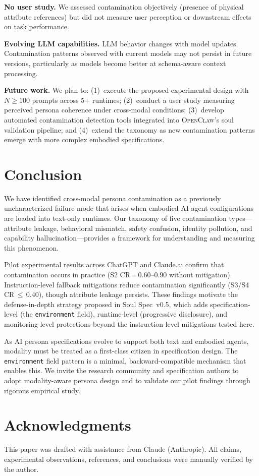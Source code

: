 \documentclass[manuscript,screen,nonacm]{acmart}
\begin{document}
\textbf{No user study.}
We assessed contamination objectively (presence of physical attribute references) but did not measure user perception or downstream effects on task performance.

\textbf{Evolving LLM capabilities.}
LLM behavior changes with model updates.
Contamination patterns observed with current models may not persist in future versions, particularly as models become better at schema-aware context processing.

\textbf{Future work.}
We plan to: (1)~execute the proposed experimental design with $N \geq 100$ prompts across 5+ runtimes; (2)~conduct a user study measuring perceived persona coherence under cross-modal conditions; (3)~develop automated contamination detection tools integrated into \textsc{OpenClaw}'s soul validation pipeline; and (4)~extend the taxonomy as new contamination patterns emerge with more complex embodied specifications.


\section{Conclusion}
\label{sec:conclusion}

We have identified cross-modal persona contamination as a previously uncharacterized failure mode that arises when embodied AI agent configurations are loaded into text-only runtimes.
Our taxonomy of five contamination types---attribute leakage, behavioral mismatch, safety confusion, identity pollution, and capability hallucination---provides a framework for understanding and measuring this phenomenon.

Pilot experimental results across ChatGPT and Claude.ai confirm that contamination occurs in practice (S2 CR\,=\,0.60--0.90 without mitigation).
Instruction-level fallback mitigations reduce contamination significantly (S3/S4 CR\,$\leq$\,0.40), though attribute leakage persists.
These findings motivate the defense-in-depth strategy proposed in Soul Spec~v0.5, which adds specification-level (the \texttt{environment} field), runtime-level (progressive disclosure), and monitoring-level protections beyond the instruction-level mitigations tested here.

As AI persona specifications evolve to support both text and embodied agents, modality must be treated as a first-class citizen in specification design.
The \texttt{environment} field pattern is a minimal, backward-compatible mechanism that enables this.
We invite the research community and specification authors to adopt modality-aware persona design and to validate our pilot findings through rigorous empirical study.

\section*{Acknowledgments}
This paper was drafted with assistance from Claude (Anthropic). All claims, experimental observations, references, and conclusions were manually verified by the author.



\end{document}
